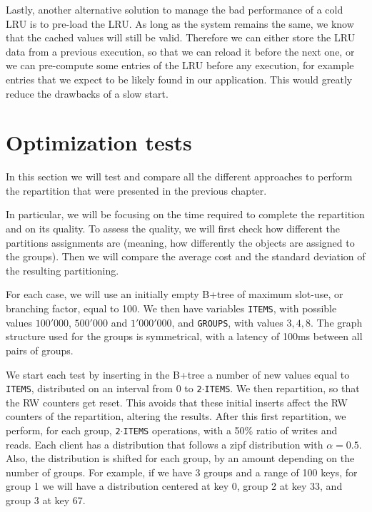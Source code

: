 Lastly, another alternative solution to manage the bad performance of a cold LRU is to pre-load the LRU. As long as the system remains the same, we know that the cached values will still be valid. Therefore we can either store the LRU data from a previous execution, so that we can reload it before the next one, or we can pre-compute some entries of the LRU before any execution, for example entries that we expect to be likely found in our application. This would greatly reduce the drawbacks of a slow start.

\chapter{Optimization tests}\label{sec:optimization-tests}
In this section we will test and compare all the different approaches to perform the repartition that were presented in the previous chapter.

In particular, we will be focusing on the time required to complete the repartition and on its quality. To assess the quality, we will first check how different the partitions assignments are (meaning, how differently the objects are assigned to the groups). Then we will compare the average cost and the standard deviation of the resulting partitioning. 

For each case, we will use an initially empty B+tree of maximum slot-use, or branching factor, equal to 100. We then have variables \texttt{ITEMS}, with possible values $100'000$, $500'000$ and $1'000'000$, and \texttt{GROUPS}, with values $3, 4, 8$. The graph structure used for the groups is symmetrical, with a latency of 100ms between all pairs of groups.

We start each test by inserting in the B+tree a number of new values equal to \texttt{ITEMS}, distributed on an interval from $0$ to \texttt{2$\cdot$ITEMS}. We then repartition, so that the RW counters get reset. This avoids that these initial inserts affect the RW counters of the repartition, altering the results. After this first repartition, we perform, for each group, \texttt{2$\cdot$ITEMS} operations, with a 50\% ratio of writes and reads. Each client has a distribution that follows a zipf distribution\cite{zipf} with $\alpha=0.5$. Also, the distribution is shifted for each group, by an amount depending on the number of groups. For example, if we have 3 groups and a range of 100 keys, for group 1 we will have a distribution centered at key 0, group 2 at key 33, and group 3 at key 67.

